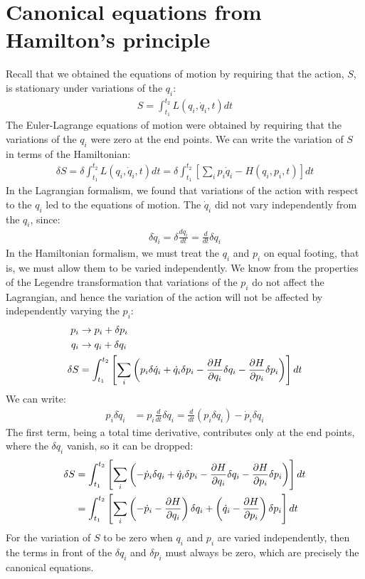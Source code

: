 \section{Canonical equations from Hamilton's principle}
Recall that we obtained the equations of motion by requiring that the action, $S$, is stationary under variations of the $q_i$:
\begin{align}
S=\int_{t_1}^{t_2}L(q_i,\dot q_i, t) dt
\end{align}
The Euler-Lagrange equations of motion were obtained by requiring that the variations of the $q_i$ were zero at the end points. We can write the variation of $S$ in terms of the Hamiltonian:
\begin{align}
\delta S = \delta \int_{t_1}^{t_2}L(q_i,\dot q_i, t) dt = \delta\int_{t_1}^{t_2}\left[\sum_ip_i\dot q_i-H(q_i,p_i,t)\right]dt
\end{align}
In the Lagrangian formalism, we found that variations of the action with respect to the $q_i$ led to the equations of motion. The $\dot q_i$ did not vary independently from the $q_i$, since:
\begin{align}
\delta \dot q_i=\delta \frac{dq_i}{dt}=\frac{d}{dt}\delta q_i
\end{align}
In the Hamiltonian formalism, we must treat the $q_i$ and $p_i$ on equal footing, that is, we must allow them to be varied independently. We know from the properties of the Legendre transformation that variations of the $p_i$ do not affect the Lagrangian, and hence the variation of the action will not be affected by independently varying the $p_i$:
\begin{align}
p_i &\to p_i+\delta p_i \nonumber\\
q_i &\to q_i+\delta q_i\nonumber\\
\delta S &= \int_{t_1}^{t_2}\left[\sum_i\left(p_i\delta\dot q_i+\dot q_i \delta p_i-\frac{\partial H}{\partial q_i}\delta q_i -\frac{\partial H}{\partial p_i}\delta p_i\right)\right]dt
\end{align}
We can write:
\begin{align}
p_i\delta\dot q_i &=p_i\frac{d}{dt}\delta q_i=\frac{d}{dt}(p_i\delta q_i)-\dot p_i \delta q_i
\end{align}
The first term, being a total time derivative, contributes only at the end points, where the $\delta q_i$ vanish, so it can be dropped:
\begin{align}
\delta S &= \int_{t_1}^{t_2}\left[\sum_i\left(-\dot p_i \delta q_i+\dot q_i \delta p_i-\frac{\partial H}{\partial q_i}\delta q_i -\frac{\partial H}{\partial p_i}\delta p_i\right)\right]dt\nonumber\\
&=\int_{t_1}^{t_2}\left[\sum_i\left( -\dot p_i -\frac{\partial H}{\partial q_i}\right)\delta q_i+\left(\dot q_i-\frac{\partial H}{\partial p_i}  \right)\delta p_i  \right]dt
\end{align}
For the variation of $S$ to be zero when $q_i$ and $p_i$ are varied independently, then the terms in front of the $\delta q_i$ and $\delta p_i$ must always be zero, which are precisely the canonical equations.

